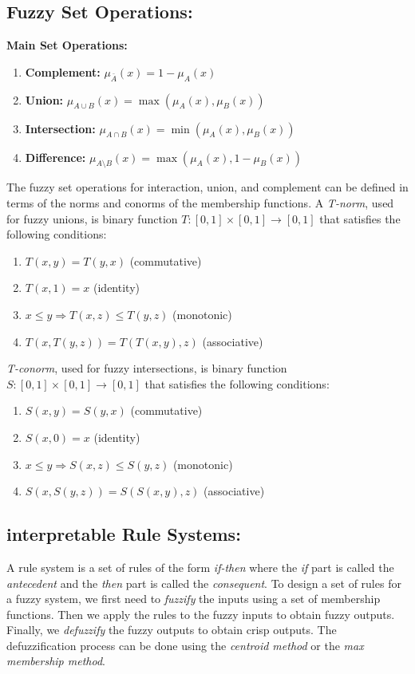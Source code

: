 \subsection{Fuzzy Set Operations:}
\textbf{Main Set Operations:}
\begin{enumerate}
        \item \textbf{Complement:} $\mu_{\bar{A}}(x)=1-\mu_A(x)$
        \item \textbf{Union:} $\mu_{A\cup B}(x)=\max(\mu_A(x),\mu_B(x))$
        \item \textbf{Intersection:} $\mu_{A\cap B}(x)=\min(\mu_A(x),\mu_B(x))$
        \item \textbf{Difference:} $\mu_{A\setminus B}(x)=\max(\mu_A(x),1-\mu_B(x))$
\end{enumerate}
The fuzzy set operations for interaction, union, and complement can be defined in terms of the norms and conorms of the membership functions. A \emph{T-norm}, used for fuzzy unions, is binary function \(T:[0,1]\times[0,1]\rightarrow[0,1]\) that satisfies the following conditions:
\begin{enumerate}
    \item $T(x,y)=T(y,x)$ (commutative)
    \item $T(x,1)=x$ (identity)
    \item $x\leq y\Rightarrow T(x,z)\leq T(y,z)$ (monotonic)
    \item $T(x,T(y,z))=T(T(x,y),z)$ (associative)
\end{enumerate}
\emph{T-conorm}, used for fuzzy intersections, is binary function \(S:[0,1]\times[0,1]\rightarrow[0,1]\) that satisfies the following conditions:
\begin{enumerate}
    \item $S(x,y)=S(y,x)$ (commutative)
    \item $S(x,0)=x$ (identity)
    \item $x\leq y\Rightarrow S(x,z)\leq S(y,z)$ (monotonic)
    \item $S(x,S(y,z))=S(S(x,y),z)$ (associative)
\end{enumerate}
\subsection{interpretable Rule Systems:} A rule system is a set of rules of the form \emph{if-then} where the \emph{if} part is called the \emph{antecedent} and the \emph{then} part is called the \emph{consequent}. To design a set of rules for a fuzzy system, we first need to \emph{fuzzify} the inputs using a set of membership functions. Then we apply the rules to the fuzzy inputs to obtain fuzzy outputs. Finally, we \emph{defuzzify} the fuzzy outputs to obtain crisp outputs. The defuzzification process can be done using the \emph{centroid method} or the \emph{max membership method}.
